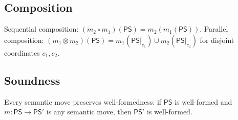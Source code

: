 \documentclass[11pt]{article}
\newcommand{\PS}{\mathsf{PS}}
\begin{document}
\subsection{Composition}

\begin{definition}\label{def:composition}
Sequential composition: $(m_2 \circ m_1)(\PS) = m_2(m_1(\PS))$.
Parallel composition: $(m_1 \otimes m_2)(\PS) = m_1(\PS|_{c_1})
\cup m_2(\PS|_{c_2})$ for disjoint coordinates $c_1, c_2$.
\end{definition}

\subsection{Soundness}

\begin{theorem}\label{thm:soundness}
Every semantic move preserves well-formedness:
if $\PS$ is well-formed and $m: \PS \to \PS'$ is any
semantic move, then $\PS'$ is well-formed.
\end{theorem}
\end{document}
